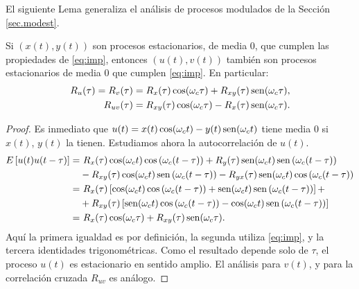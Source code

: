 El siguiente Lema generaliza el análisis de procesos modulados de la Sección \ref{sec.modest}.


\begin{lemaSN}
    Si $\left(x(t),y(t)\right)$ son procesos estacionarios, de media 0, que cumplen las propiedades de \eqref{eq:imp},
    entonces $\left(u(t),v(t)\right)$ también  son
    procesos estacionarios de media 0 que cumplen  \eqref{eq:imp}. En particular:
    \begin{align*}
                R_u(\tau)=R_v(\tau)&=R_x(\tau)\cos(\omega_c\tau)+R_{xy}(\tau)\sen(\omega_c\tau),\\
                R_{uv}(\tau)&=R_{xy}(\tau)\cos(\omega_c\tau)-R_x(\tau)\sen(\omega_c\tau). %
              \end{align*}%

        \begin{proof} Es inmediato que
        $u(t)=x(t)\cos(\omega_ct)-y(t)\operatorname{sen}(\omega_ct)$ tiene media
        0 si $x(t)$, $y(t)$ la tienen. Estudiamos ahora la autocorrelación de
        $u(t)$.
            \begin{align*}
                E\left[u(t)u(t-\tau)\right]  = & \ R_x(\tau)\cos(\omega_ct)\cos\left(\omega_c(t-\tau)\right)
                                 + R_y(\tau)\operatorname{sen}(\omega_ct)\operatorname{sen}\left(\omega_c(t-\tau)\right) \\
                                & - R_{xy}(\tau)\cos(\omega_ct)\operatorname{sen}\left(\omega_c(t-\tau)\right)
                                  - R_{yx}(\tau)\operatorname{sen}(\omega_ct)\cos\left(\omega_c(t-\tau)\right)\\
                                 = & \ R_x(\tau)\left[\cos(\omega_ct)\cos\left(\omega_c(t-\tau)\right)+\operatorname{sen}(\omega_ct)\operatorname{sen}\left(\omega_c(t-\tau)\right)\right] +\\
                                & + R_{xy}(\tau)\left[\operatorname{sen}(\omega_ct)\cos\left(\omega_c(t-\tau)\right)
                                - \cos(\omega_ct)\operatorname{sen}\left(\omega_c(t-\tau)\right)\right]    \\
                                 = & \
                                 R_x(\tau)\cos(\omega_c\tau)+R_{xy}(\tau)\operatorname{sen}(\omega_c\tau).
            \end{align*}
            Aquí la primera igualdad es por definición, la segunda utiliza  \eqref{eq:imp}, y la
            tercera identidades trigonométricas. Como el resultado depende solo de $\tau$, el proceso $u(t)$ es
            estacionario en sentido amplio. El análisis para
            $v(t)$, y para la correlación cruzada $R_{uv}$ es
            análogo.
        \end{proof}
\end{lemaSN}

